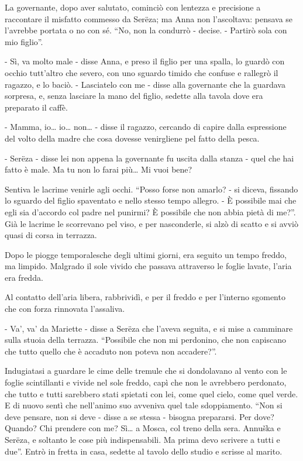 La governante, dopo aver salutato, cominciò con lentezza e precisione a raccontare il misfatto commesso da Serëza; ma Anna non l'ascoltava: pensava se l'avrebbe portata o no con sé. ``No, non la condurrò - decise. - Partirò sola con mio figlio''. 

- Sì, va molto male - disse Anna, e preso il figlio per una spalla, lo guardò con occhio tutt'altro che severo, con uno sguardo timido che confuse e rallegrò il ragazzo, e lo baciò. - Lasciatelo con me - disse alla governante che la guardava sorpresa, e, senza lasciare la mano del figlio, sedette alla tavola dove era preparato il caffè. 

- Mamma, io\ldots{} io\ldots{} non\ldots{} - disse il ragazzo, cercando di capire dalla espressione del volto della madre che cosa dovesse venirgliene pel fatto della pesca. 

- Serëza - disse lei non appena la governante fu uscita dalla stanza - quel che hai fatto è male. Ma tu non lo farai più\ldots{} Mi vuoi bene? 

Sentiva le lacrime venirle agli occhi. ``Posso forse non amarlo? - si diceva, fissando lo sguardo del figlio spaventato e nello stesso tempo allegro. - È possibile mai che egli sia d'accordo col padre nel punirmi? È possibile che non abbia pietà di me?''. Già le lacrime le scorrevano pel viso, e per nasconderle, si alzò di scatto e si avviò quasi di corsa in terrazza. 

Dopo le piogge temporalesche degli ultimi giorni, era seguito un tempo freddo, ma limpido. Malgrado il sole vivido che passava attraverso le foglie lavate, l'aria era fredda. 

Al contatto dell'aria libera, rabbrividì, e per il freddo e per l'interno sgomento che con forza rinnovata l'assaliva. 

- Va', va' da Mariette - disse a Serëza che l'aveva seguita, e si mise a camminare sulla stuoia della terrazza. ``Possibile che non mi perdonino, che non capiscano che tutto quello che è accaduto non poteva non accadere?''. 

Indugiatasi a guardare le cime delle tremule che si dondolavano al vento con le foglie scintillanti e vivide nel sole freddo, capì che non le avrebbero perdonato, che tutto e tutti sarebbero stati spietati con lei, come quel cielo, come quel verde. E di nuovo sentì che nell'animo suo avveniva quel tale sdoppiamento. ``Non si deve pensare, non si deve - disse a se stessa - bisogna prepararsi. Per dove? Quando? Chi prendere con me? Sì\ldots{} a Mosca, col treno della sera. Annuška e Serëza, e soltanto le cose più indispensabili. Ma prima devo scrivere a tutti e due''. Entrò in fretta in casa, sedette al tavolo dello studio e scrisse al marito. 

